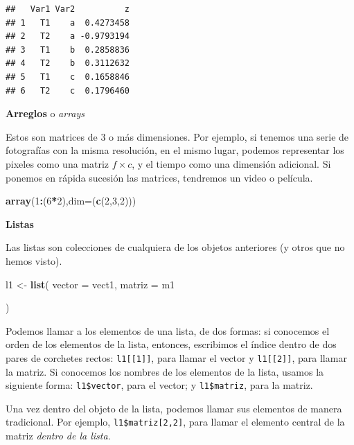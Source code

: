 \documentclass[12pt,letterpaper,]{book}
\newenvironment{Shaded}{\begin{snugshade}}{\end{snugshade}}
\newcommand{\KeywordTok}[1]{\textcolor[rgb]{0.13,0.29,0.53}{\textbf{#1}}}
\newcommand{\DataTypeTok}[1]{\textcolor[rgb]{0.13,0.29,0.53}{#1}}
\newcommand{\DecValTok}[1]{\textcolor[rgb]{0.00,0.00,0.81}{#1}}
\newcommand{\StringTok}[1]{\textcolor[rgb]{0.31,0.60,0.02}{#1}}
\newcommand{\OperatorTok}[1]{\textcolor[rgb]{0.81,0.36,0.00}{\textbf{#1}}}
\newcommand{\NormalTok}[1]{#1}
\begin{document}
\begin{verbatim}
##   Var1 Var2          z
## 1   T1    a  0.4273458
## 2   T2    a -0.9793194
## 3   T1    b  0.2858836
## 4   T2    b  0.3112632
## 5   T1    c  0.1658846
## 6   T2    c  0.1796460
\end{verbatim}

\textbf{Arreglos} o \emph{arrays}

Estos son matrices de 3 o más dimensiones. Por ejemplo, si tenemos una
serie de fotografías con la misma resolución, en el mismo lugar, podemos
representar los pixeles como una matriz \(f\times c\), y el tiempo como
una dimensión adicional. Si ponemos en rápida sucesión las matrices,
tendremos un video o película.

\begin{Shaded}
\begin{Highlighting}[]
\KeywordTok{array}\NormalTok{(}\DecValTok{1}\OperatorTok{:}\NormalTok{(}\DecValTok{6}\OperatorTok{*}\DecValTok{2}\NormalTok{),}\DataTypeTok{dim=}\NormalTok{(}\KeywordTok{c}\NormalTok{(}\DecValTok{2}\NormalTok{,}\DecValTok{3}\NormalTok{,}\DecValTok{2}\NormalTok{)))}
\end{Highlighting}
\end{Shaded}

\textbf{Listas}

Las listas son colecciones de cualquiera de los objetos anteriores (y
otros que no hemos visto).

\begin{Shaded}
\begin{Highlighting}[]
\NormalTok{l1 <-}\StringTok{ }\KeywordTok{list}\NormalTok{(}
  \DataTypeTok{vector =}\NormalTok{ vect1,}
  \DataTypeTok{matriz =}\NormalTok{ m1}
  
\NormalTok{)}
\end{Highlighting}
\end{Shaded}

Podemos llamar a los elementos de una lista, de dos formas: si conocemos
el orden de los elementos de la lista, entonces, escribimos el índice
dentro de dos pares de corchetes rectos: \texttt{l1{[}{[}1{]}{]}}, para
llamar el vector y \texttt{l1{[}{[}2{]}{]}}, para llamar la matriz. Si
conocemos los nombres de los elementos de la lista, usamos la siguiente
forma: \texttt{l1\$vector}, para el vector; y \texttt{l1\$matriz}, para
la matriz.

Una vez dentro del objeto de la lista, podemos llamar sus elementos de
manera tradicional. Por ejemplo, \texttt{l1\$matriz{[}2,2{]}}, para
llamar el elemento central de la matriz \emph{dentro de la lista}.
\end{document}
